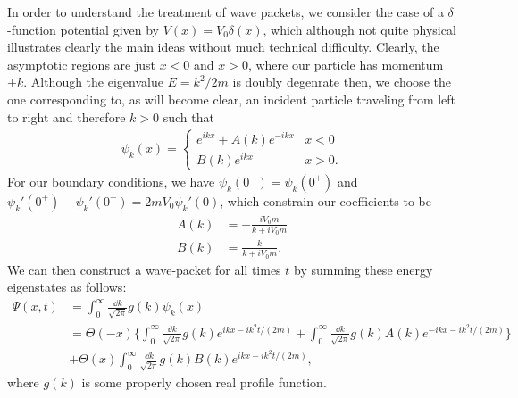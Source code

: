 In order to understand the treatment of wave packets, we consider the case of a $\delta$-function potential given by $V(x) = V_0 \delta(x)$, which although not quite physical illustrates clearly the main ideas without much technical difficulty.
Clearly, the asymptotic regions are just $x < 0$ and $x > 0$, where our particle has momentum $\pm k$.
Although the eigenvalue $E = k^2/2m$ is doubly degenrate then, we choose the one corresponding to, as will become clear, an incident particle traveling from left to right and therefore $k > 0$ such that
\begin{align}
    \psi_{k}(x) = 
    \begin{cases}
        e^{i k x} + A(k) e^{-i k x} & x < 0 \\
        B(k) e^{i k x} & x > 0
    .\end{cases}
\end{align}
For our boundary conditions, we have $\psi_{k}(0^{-}) = \psi_{k}(0^{+})$ and $\psi_{k}'(0^{+}) - \psi_{k}'(0^{-}) = 2 m V_0 \psi_{k}'(0)$, which constrain our coefficients to be
\begin{align}
    A(k) &= -\frac{i V_0 m}{k + i V_0 m} \\
    B(k) &= \frac{k}{k + i V_0 m}
.\end{align}
We can then construct a wave-packet for all times $t$ by summing these energy eigenstates as follows:
\begin{align}
    \Psi(x,t) &= \int_{0}^{\infty} \frac{\dd{k}}{\sqrt{2 \pi}} g(k) \psi_{k}(x) \nonumber \\
              &= \Theta(-x) \Bigg\{ \int_{0}^{\infty} \frac{\dd{k}}{\sqrt{2 \pi}} g(k) e^{i k x - i k^2 t / (2m)} + \int_{0}^{\infty} \frac{\dd{k}}{\sqrt{2 \pi}} g(k) A(k) e^{-i k x - i k^2 t / (2m)} \Bigg\} \nonumber \\
              &+ \Theta(x) \int_{0}^{\infty} \frac{\dd{k}}{\sqrt{2 \pi}} g(k) B(k) e^{i k x - i k^2 t / (2m)}
,\end{align}
where $g(k)$ is some properly chosen real profile function.

